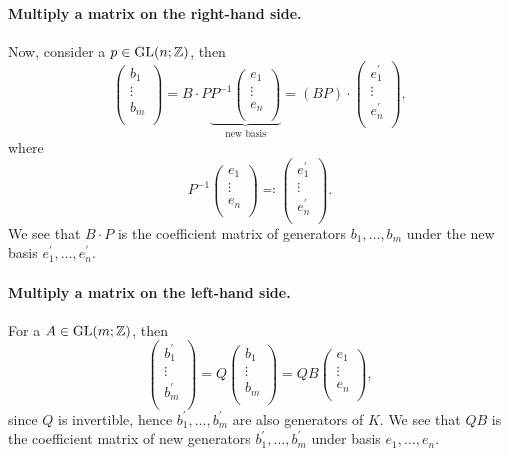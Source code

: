 \paragraph{Multiply a matrix on the right-hand side.} Now, consider a \(p\in \mathrm{GL}(n; \mathbb{Z} ) \), then
\[
	\begin{pmatrix}
		b_1    \\
		\vdots \\
		b_{m}  \\
	\end{pmatrix} = B \cdot P \underbrace{P^{-1} \begin{pmatrix}
			e_{1}  \\
			\vdots \\
			e_{n}  \\
		\end{pmatrix}}_{\text{new basis} } = (BP)\cdot \begin{pmatrix}
		e_{1}^\prime \\
		\vdots       \\
		e_{n}^\prime \\
	\end{pmatrix},
\]
where
\[
	P^{-1} \begin{pmatrix}
		e_{1}  \\
		\vdots \\
		e_{n}  \\
	\end{pmatrix} \eqqcolon \begin{pmatrix}
		e_{1}^\prime \\
		\vdots       \\
		e_{n}^\prime \\
	\end{pmatrix}.
\]
We see that \(B\cdot P\) is the coefficient matrix of generators \(b_{1}, \dots , b_{m}   \) under the new basis \(e_1^\prime , \dots , e_{n} ^\prime  \).

\paragraph{Multiply a matrix on the left-hand side.} For a \(A\in \mathrm{GL}(m; \mathbb{Z} ) \), then
\[
	\begin{pmatrix}
		b_1^\prime \\
		\vdots     \\
		b_m^\prime \\
	\end{pmatrix} = Q \begin{pmatrix}
		b_1    \\
		\vdots \\
		b_m    \\
	\end{pmatrix} = QB\begin{pmatrix}
		e_{1}  \\
		\vdots \\
		e_{n}  \\
	\end{pmatrix},
\]
since \(Q\) is invertible, hence \(b_1^\prime , \dots , b_{m} ^\prime\) are also generators of \(K\). We see that \(QB\) is the coefficient matrix of new generators
\(b_1^\prime , \dots , b_{m} ^\prime  \) under basis \(e_1, \dots , e_{n}  \).

